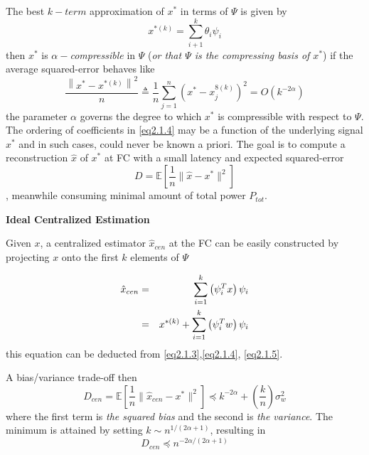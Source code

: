 The best $k-term$ approximation of $x^*$ in terms of $\Psi$ is given by 
\begin{equation}
    x^{*(k)} = \sum\limits_{i+1}^{k}\theta_i\psi_i 
    \label{eq2.1.5}
\end{equation}
then $x^*$ is \emph{\textcolor[rgb]{1,0,0}{$\alpha-$compressible}} in $\Psi$ (\emph{\textcolor[rgb]{1,0,0}{or that $\Psi$ is the compressing basis of $x^*$}}) if the \textcolor[rgb]{1,0,0}{average squared-error} behaves like
\begin{equation}
    \dfrac{\left\|x^*-x^{*(k)}\right\|^2}{n} \triangleq \dfrac{1}{n} \sum\limits_{j=1}^{n}\left( x^* - x_j^{8(k)} \right)^2 = O (k^{-2\alpha})
    \label{eq2.1.6}
\end{equation} 
the parameter $\alpha$ governs the degree to which $x^*$ is compressible with respect to $\Psi$. The ordering of coefficients in \cref{eq2.1.4} may be a function of the underlying signal $x^*$ and in such cases, could never be known a priori. The goal is to compute a reconstruction $\hat{x}$ of $x^*$ at FC with a small latency and expected squared-error \[
    D = \mathbb{E}[\dfrac{1}{n}\|\hat{x}-x^*\|^2] 
\], meanwhile consuming minimal amount of total power $P_{tot}$.

\textbf{\textcolor[rgb]{1,0,0}{Ideal Centralized Estimation}}

Given $x$, a centralized estimator $\hat{x}_{cen}$ at the FC can be easily constructed by projecting $x$ onto the first $k$ elements of $\Psi$

\begin{eqnarray}
    \label{eq2.1.7}
    \hat{x}_{cen} &=& \sum\limits_{i = 1}^{k} \left( \psi_i^T x\right)\psi_i \notag \\
    &=& x^{*(k)} + \sum\limits_{i=1}^{k}\left( \psi_i^T w \right)\psi_i 
\end{eqnarray}
this equation can be deducted from \cref{eq2.1.3},\cref{eq2.1.4}, \cref{eq2.1.5}.

A bias/variance trade-off then
\begin{equation}
    D_{cen} = \mathbb{E}\left[ \dfrac{1}{n}\|\hat{x}_{cen}-x^*\|^2 \right] \preceq k^{-2\alpha}+\left( \dfrac{k}{n} \right)\sigma_w^2
    \label{eq2.1.8}
\end{equation}
where the first term is \emph{\textcolor[rgb]{1,0,0}{the squared bias}} and the second is \emph{\textcolor[rgb]{1,0,0}{the variance}}. The minimum is attained by setting $k \sim n^{1/(2\alpha+1)}$, resulting in
\begin{equation}
    D_{cen} \preceq n^{-2\alpha/(2\alpha+1)}
    \label{eq2.1.9}
\end{equation}

